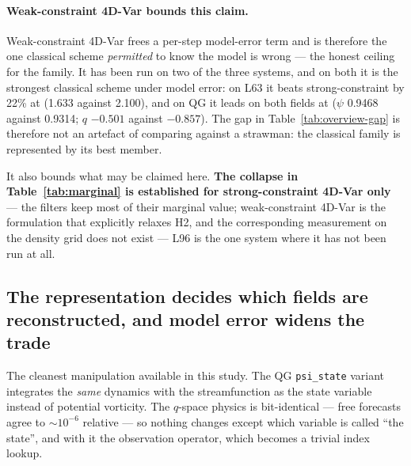 \paragraph{Weak-constraint 4D-Var bounds this claim.}
\label{sec:weak4dvar}
Weak-constraint 4D-Var frees a per-step model-error term and is therefore the one
classical scheme \emph{permitted} to know the model is wrong --- the honest
ceiling for the family. It has been run on two of the three systems, and on both
it is the strongest classical scheme under model error: on L63 it beats
strong-constraint by 22\% at \So{} (1.633 against 2.100), and on QG it leads on
both fields at \So{} ($\psi$ 0.9468 against 0.9314; $q$ $-0.501$ against
$-0.857$). The gap in Table~\ref{tab:overview-gap} is therefore not an artefact
of comparing against a strawman: the classical family is represented by its best
member.

It also bounds what may be claimed here. \textbf{The collapse in
Table~\ref{tab:marginal} is established for strong-constraint 4D-Var only} ---
the filters keep most of their marginal value; weak-constraint 4D-Var is the
formulation that explicitly relaxes
H2, and the corresponding measurement on the density grid does not exist --- L96
is the one system where it has not been run at all.

\subsection{The representation decides which fields are reconstructed, and model
error widens the trade}
\label{sec:representation}

The cleanest manipulation available in this study. The QG \texttt{psi\_state}
variant integrates the \emph{same} dynamics with the streamfunction as the state
variable instead of potential vorticity. The $q$-space physics is bit-identical
--- free forecasts agree to $\sim 10^{-6}$ relative --- so nothing changes except
which variable is called ``the state'', and with it the observation operator,
which becomes a trivial index lookup.

